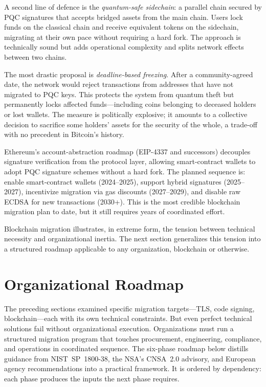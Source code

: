 A second line of defence is the \emph{quantum-safe sidechain}: a parallel chain secured by PQC signatures that accepts bridged assets from the main chain.  Users lock funds on the classical chain and receive equivalent tokens on the sidechain, migrating at their own pace without requiring a hard fork.  The approach is technically sound but adds operational complexity and splits network effects between two chains.

The most drastic proposal is \emph{deadline-based freezing}.  After a community-agreed date, the network would reject transactions from addresses that have not migrated to PQC keys.  This protects the system from quantum theft but permanently locks affected funds---including coins belonging to deceased holders or lost wallets.  The measure is politically explosive; it amounts to a collective decision to sacrifice some holders' assets for the security of the whole, a trade-off with no precedent in Bitcoin's history.

\begin{example}
\label{ex:ethereum-pqc}
Ethereum's account-abstraction roadmap (EIP-4337 and successors) decouples signature verification from the protocol layer, allowing smart-contract wallets to adopt PQC signature schemes without a hard fork.  The planned sequence is: enable smart-contract wallets (2024--2025), support hybrid signatures (2025--2027), incentivize migration via gas discounts (2027--2029), and disable raw ECDSA for new transactions (2030+).  This is the most credible blockchain migration plan to date, but it still requires years of coordinated effort.
\end{example}

Blockchain migration illustrates, in extreme form, the tension between technical necessity and organizational inertia.  The next section generalizes this tension into a structured roadmap applicable to any organization, blockchain or otherwise.


\section{Organizational Roadmap}
\label{sec:roadmap}

The preceding sections examined specific migration targets---TLS, code signing, blockchain---each with its own technical constraints.  But even perfect technical solutions fail without organizational execution.  Organizations must run a structured migration program that touches procurement, engineering, compliance, and operations in coordinated sequence.  The six-phase roadmap below distills guidance from NIST~SP~1800-38, the NSA's CNSA~2.0 advisory, and European agency recommendations into a practical framework.  It is ordered by dependency: each phase produces the inputs the next phase requires.

